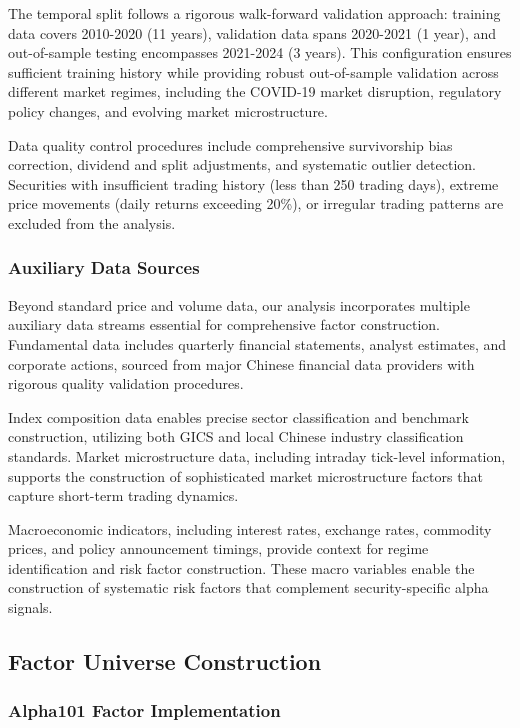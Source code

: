 \documentclass[conference]{IEEEtran}
\begin{document}
The temporal split follows a rigorous walk-forward validation approach: training data covers 2010-2020 (11 years), validation data spans 2020-2021 (1 year), and out-of-sample testing encompasses 2021-2024 (3 years). This configuration ensures sufficient training history while providing robust out-of-sample validation across different market regimes, including the COVID-19 market disruption, regulatory policy changes, and evolving market microstructure.

Data quality control procedures include comprehensive survivorship bias correction, dividend and split adjustments, and systematic outlier detection. Securities with insufficient trading history (less than 250 trading days), extreme price movements (daily returns exceeding 20\%), or irregular trading patterns are excluded from the analysis.

\subsubsection{Auxiliary Data Sources}

Beyond standard price and volume data, our analysis incorporates multiple auxiliary data streams essential for comprehensive factor construction. Fundamental data includes quarterly financial statements, analyst estimates, and corporate actions, sourced from major Chinese financial data providers with rigorous quality validation procedures.

Index composition data enables precise sector classification and benchmark construction, utilizing both GICS and local Chinese industry classification standards. Market microstructure data, including intraday tick-level information, supports the construction of sophisticated market microstructure factors that capture short-term trading dynamics.

Macroeconomic indicators, including interest rates, exchange rates, commodity prices, and policy announcement timings, provide context for regime identification and risk factor construction. These macro variables enable the construction of systematic risk factors that complement security-specific alpha signals.

\subsection{Factor Universe Construction}

\subsubsection{Alpha101 Factor Implementation}
\end{document}
